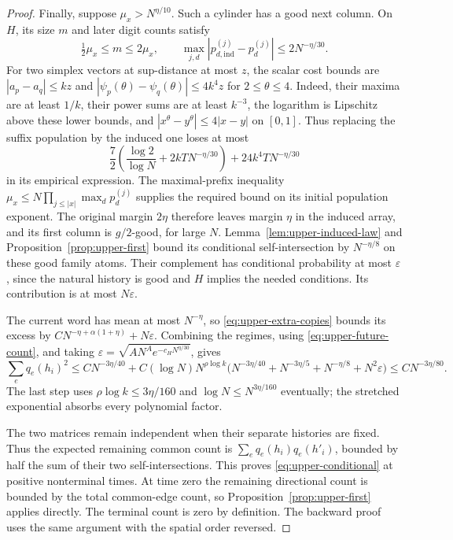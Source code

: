 \documentclass[11pt]{article}
\numberwithin{equation}{section}
\theoremstyle{definition}
\theoremstyle{remark}
\newcommand{\1}{\mathbf 1}
\begin{document}
\begin{proof}
Finally, suppose $\mu_x>N^{\eta/10}$. Such a cylinder has a good
next column. On $H$, its size $m$ and later digit counts satisfy
\[
 \tfrac12\mu_x\le m\le2\mu_x,\qquad
 \max_{j,d}|p_{d,\mathrm{ind}}^{(j)}-p_d^{(j)}|
                            \le2N^{-\eta/30}.
\]
For two simplex vectors at sup-distance at most $z$, the scalar
cost bounds are
$|a_p-a_q|\le kz$ and
$|\psi_p(\theta)-\psi_q(\theta)|\le4k^4z$ for $2\le\theta\le4$.
Indeed, their maxima are at least $1/k$, their power sums are at
least $k^{-3}$, the logarithm is Lipschitz above these lower bounds,
and $|x^\theta-y^\theta|\le4|x-y|$ on $[0,1]$.
Thus replacing the suffix population by the induced one loses at
most
\[
 \frac72\left(\frac{\log2}{\log N}+2kT N^{-\eta/30}\right)
                         +24k^4T N^{-\eta/30}
\]
in its empirical expression. The maximal-prefix inequality
$\mu_x\le N\prod_{j\le|x|}\max_d p_d^{(j)}$ supplies the required
bound on its initial population exponent. The original margin
$2\eta$ therefore leaves margin $\eta$ in the induced array, and
its first column is $g/2$-good, for large $N$.
Lemma~\ref{lem:upper-induced-law} and
Proposition~\ref{prop:upper-first} bound its conditional
self-intersection by $N^{-\eta/8}$ on these good family atoms.
Their complement has conditional probability at most $\varepsilon$,
since the natural history is good and $H$ implies the needed
conditions. Its contribution is at most $N\varepsilon$.

The current word has mean at most $N^{-\eta}$, so
\eqref{eq:upper-extra-copies} bounds its excess by
$CN^{-\eta+\alpha(1+\eta)}+N\varepsilon$.
Combining the regimes, using \eqref{eq:upper-future-count}, and
taking $\varepsilon=\sqrt{AN^A e^{-c_HN^{\eta/30}}}$, gives
\[
 \sum_e q_e(h_i)^2\le
 CN^{-3\eta/40}
 +C(\log N)N^{\rho\log k}
       \bigl(N^{-3\eta/40}+N^{-3\eta/5}+N^{-\eta/8}
                                      +N^2\varepsilon\bigr)
 \le CN^{-3\eta/80}.
\]
The last step uses $\rho\log k\le3\eta/160$ and
$\log N\le N^{3\eta/160}$ eventually; the stretched exponential
absorbs every polynomial factor.

The two matrices remain independent when their separate histories
are fixed. Thus the expected remaining common count is
$\sum_e q_e(h_i)q_e(h'_i)$, bounded by half the sum of their two
self-intersections. This proves \eqref{eq:upper-conditional} at
positive nonterminal times. At time zero the remaining directional
count is bounded by the total common-edge count, so
Proposition~\ref{prop:upper-first} applies directly. The terminal
count is zero by definition. The backward proof uses the same
argument with the spatial order reversed.
\end{proof}
\end{document}
